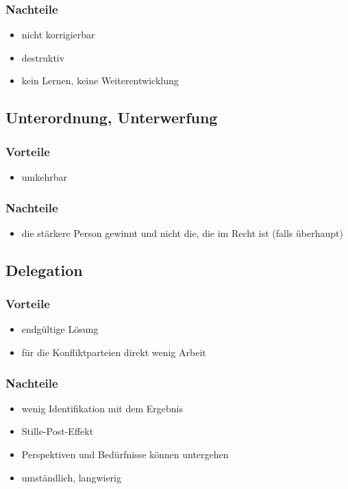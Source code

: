 \subsubsection{Nachteile}
\begin{itemize}
    \item nicht korrigierbar
    \item destruktiv
    \item kein Lernen, keine Weiterentwicklung
\end{itemize}

\subsection{Unterordnung, Unterwerfung}

\subsubsection{Vorteile}
\begin{itemize}
    \item umkehrbar
\end{itemize}

\subsubsection{Nachteile}
\begin{itemize}
    \item die stärkere Person gewinnt und nicht die, die im Recht ist (falls überhaupt)
\end{itemize}

\subsection{Delegation}

\subsubsection{Vorteile}
\begin{itemize}
    \item endgültige Lösung
    \item für die Konfliktparteien direkt wenig Arbeit
\end{itemize}

\subsubsection{Nachteile}
\begin{itemize}
    \item wenig Identifikation mit dem Ergebnis
    \item Stille-Post-Effekt
    \item Perspektiven und Bedürfnisse können untergehen
    \item umständlich, langwierig
\end{itemize}

